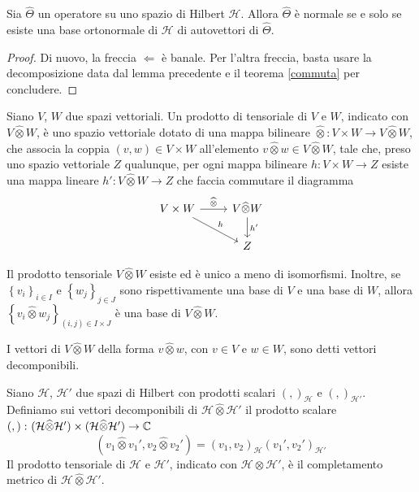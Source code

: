 \documentclass[a4paper, 11pt]{article}
\renewcommand{\H}{\mathcal{H}}
\begin{document}
\begin{theorem}
	Sia $\hat{\Theta}$ un operatore su uno spazio di Hilbert $\H$. Allora $\hat{\Theta}$ è normale se e solo se esiste una base ortonormale di $\H$ di autovettori di $\hat{\Theta}$.
\end{theorem}
\begin{proof}
	Di nuovo, la freccia $\Leftarrow$ è banale. Per l'altra freccia, basta usare la decomposizione data dal lemma precedente e il teorema \ref{commuta} per concludere.
\end{proof}
\begin{definition}
	Siano $V$, $W$ due spazi vettoriali. Un prodotto di tensoriale di $V$ e $W$, indicato con $V\widehat{\otimes} W$, è uno spazio vettoriale dotato di una mappa bilineare $\widehat\otimes\colon V\times W\to V\widehat\otimes W$, che associa la coppia $(v,w)\in V\times W$ all'elemento $v\widehat\otimes w\in V\widehat\otimes W$, tale che, preso uno spazio vettoriale $Z$ qualunque, per ogni mappa bilineare $h\colon V\times W\to Z$ esiste una mappa lineare $h'\colon V\widehat\otimes W\to Z$ che faccia commutare il diagramma
	\[\begin{tikzcd}
	V\times W \arrow[dr, "h"] \arrow[r, "\widehat{\otimes}"]&V\widehat{\otimes} W\arrow[d, "h'"]\\
	&Z
	\end{tikzcd}\]
\end{definition}
\begin{theorem}\label{tensorbase}
	Il prodotto tensoriale $V\widehat{\otimes}W$ esiste ed è unico a meno di isomorfismi. Inoltre, se $\left\{v_i\right\}_{i\in I}$ e $\left\{w_j\right\}_{j\in J}$ sono rispettivamente una base di $V$ e una base di $W$, allora $\left\{v_i\widehat{\otimes}w_j\right\}_{(i,j)\in I\times J}$ è una base di $V\widehat{\otimes}W$.
\end{theorem}
\begin{definition}
	I vettori di $V\widehat{\otimes}W$ della forma $v\widehat{\otimes}w$, con $v\in V$ e $w\in W$, sono detti vettori decomponibili.
\end{definition}
\begin{definition} Siano $\H$, $\H'$ due spazi di Hilbert con prodotti scalari $(,)_\H$ e $(,)_{\H'}$. Definiamo sui vettori decomponibili di $\H\widehat{\otimes}\H'$ il prodotto scalare $\left(,\right)\colon(\H\widehat{\otimes}\H')\times(\H\widehat{\otimes}\H')\to\C$
	\[(v_1\widehat{\otimes}v_1',v_2\widehat{\otimes}v_2')=(v_1,v_2)_\H(v_1',v_2')_{\H'}\]
Il prodotto tensoriale di $\H$ e $\H'$, indicato con $\H\otimes\H'$, è il completamento metrico di $\H\widehat{\otimes}\H'$.
\end{definition}
\end{document}
